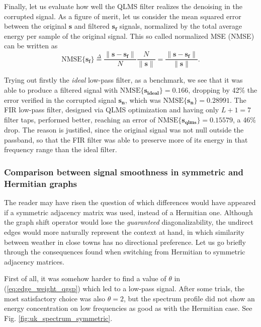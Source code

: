 Finally, let us evaluate how well the QLMS filter realizes the denoising in the corrupted signal. As a figure of merit, let us consider the mean squared error between the original $\mathbf{s}$ and filtered $\mathbf{s_f}$ signals, normalized by the total average energy per sample of the original signal. This so called normalized MSE (NMSE) can be written as
\begin{equation}
\label{eq:errormetric}
\text{NMSE}\{ \mathbf{s_f} \} \overset{\Delta}{=}
\frac{\parallel \mathbf{s} - \mathbf{s_f} \parallel}{N} 
\frac{N}{{\parallel \mathbf{s} \parallel}}
=
\frac{\parallel \mathbf{s} - \mathbf{s_f} \parallel}{\parallel \mathbf{s} \parallel}.
\end{equation}

Trying out firstly the \textit{ideal} low-pass filter, as a benchmark, we see that it was able to produce a filtered signal with $\text{NMSE}\{ \mathbf{s_{ideal}} \} = 0.166$, dropping by 42\% the error verified in the corrupted signal $\mathbf{s_n}$, which was $\text{NMSE}\{ \mathbf{s_n} \} = 0.28991$. The FIR low-pass filter, designed via QLMS optimization and having only $L+1 = 7$ filter taps, performed better, reaching an error of $\text{NMSE}\{ \mathbf{s_{qlms}} \} = 0.15579$, a 46\% drop. The reason is justified, since the original signal was not null outside the passband, so that the FIR filter was able to preserve more of its energy in that frequency range than the ideal filter.

\subsubsection{Comparison between signal smoothness in symmetric and Hermitian graphs}

The reader may have risen the question of which differences would have appeared if a symmetric adjacency matrix was used, instead of a Hermitian one. Although the graph shift operator would lose the \textit{guaranteed} diagonalizability, the undirect edges would more naturally represent the context at hand, in which similarity between weather in close towns has no directional preference. Let us go briefly through the consequences found when switching from Hermitian to symmetric adjacency matrices.

First of all, it was somehow harder to find a value of $\theta$ in (\ref{eq:edge_weight_qgsp}) which led to a low-pass signal. After some trials, the most satisfactory choice was also $\theta = 2$, but the spectrum profile did not show an energy concentration on low frequencies as good as with the Hermitian case. See Fig. \ref{fig:uk_spectrum_symmetric}.

